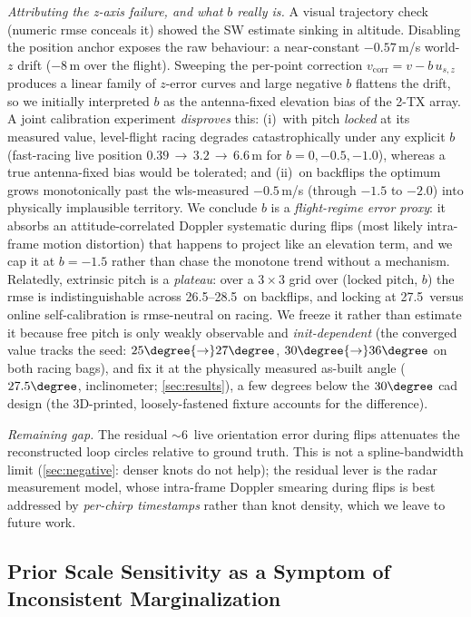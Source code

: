 \emph{Attributing the z-axis failure, and what $b$ really is.}
A visual trajectory check (numeric \ac{rmse} conceals it) showed the SW
estimate sinking in altitude.  Disabling the position anchor exposes
the raw behaviour: a near-constant $-0.57$\,m/s world-$z$ drift
($-8$\,m over the flight).  Sweeping the per-point correction
$v_{\mathrm{corr}} = v - b\,u_{s,z}$ produces a linear family of
$z$-error curves and large negative $b$ flattens the drift, so we
initially interpreted $b$ as the antenna-fixed elevation bias of the
2-TX array.  A joint calibration experiment \emph{disproves} this: (i)~with pitch
\emph{locked} at its measured value, level-flight racing degrades
catastrophically under any explicit $b$ (fast-racing live position
$0.39\,{\to}\,3.2\,{\to}\,6.6$\,m for $b{=}0,-0.5,-1.0$), whereas a true
antenna-fixed bias would be tolerated; and (ii)~on backflips the optimum
grows monotonically past the \ac{wls}-measured $-0.5$\,m/s (through $-1.5$
to $-2.0$) into physically implausible territory.
We conclude $b$ is a \emph{flight-regime error proxy}: it absorbs
an attitude-correlated Doppler systematic during flips (most likely
intra-frame motion distortion) that happens to project like an
elevation term, and we cap it at $b{=}{-}1.5$ rather than chase
the monotone trend without a mechanism.
Relatedly, extrinsic pitch is a \emph{plateau}: over a $3{\times}3$ grid
over (locked pitch, $b$) the \ac{rmse} is indistinguishable across
26.5--28.5\degree\ on backflips, and locking at 27.5\degree\ versus
online self-calibration is \ac{rmse}-neutral on racing.  We freeze it
rather than estimate it because free pitch is only weakly observable and
\emph{init-dependent} (the converged value tracks the seed:
$25\degree{\to}27\degree$, $30\degree{\to}36\degree$ on both racing bags),
and fix it at the physically measured as-built angle ($27.5\degree$,
inclinometer; \autoref{sec:results}), a few degrees below the $30\degree$
\ac{cad} design (the 3D-printed, loosely-fastened fixture accounts for the
difference).

\emph{Remaining gap.}
The residual $\sim$6\degree\ live orientation error during flips
attenuates the reconstructed loop circles relative to ground truth.
This is not a spline-bandwidth limit (\autoref{sec:negative}: denser
knots do not help); the residual lever is the radar measurement model,
whose intra-frame Doppler smearing during flips is best addressed by
\emph{per-chirp timestamps} rather than knot density, which we leave to
future work.


\subsection{Prior Scale Sensitivity as a Symptom of Inconsistent
Marginalization}
\label{sec:prior_scale}

